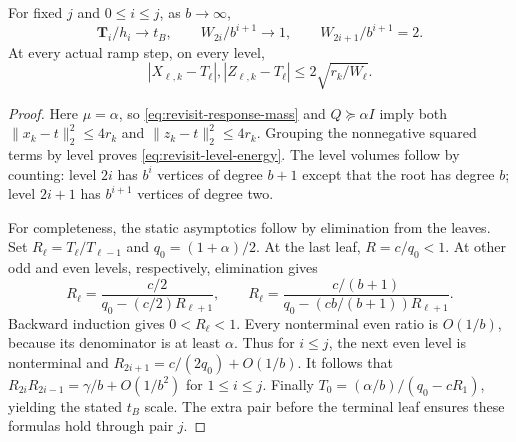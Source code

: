 \begin{lemma}
\label{lem:revisit-level-scales}
For fixed $j$ and $0\leq i\leq j$, as $b\to\infty$,
\[
 \mathbf T_i/h_i\longrightarrow t_B,\qquad
 W_{2i}/b^{i+1}\longrightarrow1,\qquad
 W_{2i+1}/b^{i+1}=2.
\]
At every actual ramp step, on every level,
\begin{equation}
 |X_{\ell,k}-T_\ell|,
 |Z_{\ell,k}-T_\ell|\leq2\sqrt{r_k/W_\ell}.
 \label{eq:revisit-level-energy}
\end{equation}
\end{lemma}
\begin{proof}
Here $\mu=\alpha$, so \cref{eq:revisit-response-mass} and
$Q\succeq\alpha I$ imply both
$\|x_k-t\|_2^2\leq4r_k$ and $\|z_k-t\|_2^2\leq4r_k$.
Grouping the nonnegative squared terms by level proves
\cref{eq:revisit-level-energy}. The level volumes follow by counting:
level $2i$ has $b^i$ vertices of degree $b+1$ except that the root has
degree $b$; level $2i+1$ has $b^{i+1}$ vertices of degree two.

For completeness, the static asymptotics follow by elimination from the
leaves. Set $R_\ell=T_\ell/T_{\ell-1}$ and $q_0=(1+\alpha)/2$.
At the last leaf, $R=c/q_0<1$. At other odd and even levels,
respectively, elimination gives
\[
 R_\ell=\frac{c/2}{q_0-(c/2)R_{\ell+1}},\qquad
 R_\ell=\frac{c/(b+1)}{q_0-(cb/(b+1))R_{\ell+1}}.
\]
Backward induction gives $0<R_\ell<1$. Every nonterminal even ratio
is $O(1/b)$, because its denominator is at least $\alpha$.
Thus for $i\leq j$, the next even level is nonterminal and
$R_{2i+1}=c/(2q_0)+O(1/b)$. It follows that
$R_{2i}R_{2i-1}=\gamma/b+O(1/b^2)$ for $1\leq i\leq j$.
Finally $T_0=(\alpha/b)/(q_0-cR_1)$, yielding the stated $t_B$ scale.
The extra pair before the terminal leaf ensures these formulas hold
through pair $j$.
\end{proof}

